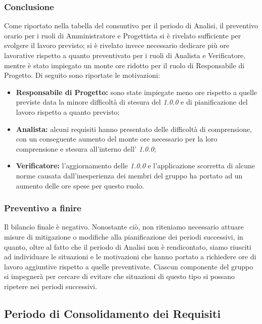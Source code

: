 \subsubsection{Conclusione}
Come riportato nella tabella del consuntivo per il periodo di Analisi, il preventivo orario per i ruoli di Amministratore e Progettista si è rivelato sufficiente per svolgere il lavoro previsto; si è rivelato  invece necessario dedicare più ore lavorative rispetto a quanto preventivato per i ruoli di Analista e Verificatore, mentre è stato impiegato un monte ore ridotto per il ruolo di Responsabile di Progetto. Di seguito sono riportate le motivazioni:
\begin{itemize}
	\item \textbf{Responsabile di Progetto:} sono state impiegate meno ore rispetto a quelle previste data la minore difficoltà di stesura del \textit{\PdP{} 1.0.0} e di pianificazione del lavoro rispetto a quanto previsto;
	\item \textbf{Analista:} alcuni requisiti hanno presentato delle difficoltà di comprensione, con un conseguente aumento del monte ore necessario per la loro comprensione e stesura all'interno dell'\textit{\AdR{} 1.0.0};
	\item \textbf{Verificatore:} l'aggiornamento delle \textit{\NdP{} 1.0.0} e l'applicazione scorretta di alcune norme causata dall'inesperienza dei membri del gruppo ha portato ad un aumento delle ore spese per questo ruolo.
\end{itemize}

\subsubsection{Preventivo a finire}
Il bilancio finale è negativo. Nonostante ciò, non riteniamo necessario attuare misure di mitigazione o modifiche alla pianificazione dei periodi successivi, in quanto, oltre al fatto che il periodo di Analisi non è rendicontato, siamo riusciti ad individuare le situazioni e le motivazioni che hanno portato a richiedere ore di lavoro aggiuntive rispetto a quelle preventivate. Ciascun componente del gruppo si impegnerà per cercare di evitare che situazioni di questo tipo si possano ripetere nei periodi successivi.

\subsection{Periodo di Consolidamento dei Requisiti}
